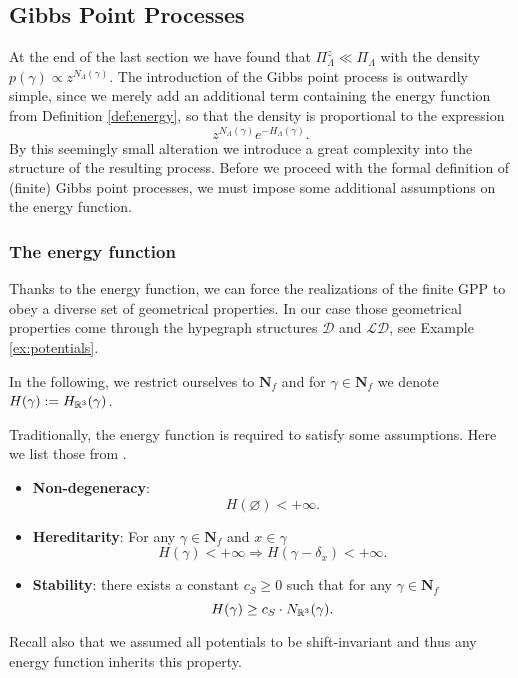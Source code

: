 \subsection{Gibbs Point Processes}\label{sec:GPP}
At the end of the last section we have found that $\Pi^z_\Lambda \ll \Pi_\Lambda$ with the density $p(\gamma) \propto z^{N_\Lambda(\gamma)}$. The introduction of the Gibbs point process is outwardly simple, since we merely add an additional term containing the energy function from Definition \ref{def:energy}, so that the density is proportional to the expression
\begin{equation}\label{eq:GPPdensity}z^{N_\Lambda(\gamma)} e^{-H_\Lambda (\gamma)}.\end{equation}
By this seemingly small alteration we introduce a great complexity into the structure of the resulting process. Before we proceed with the formal definition of (finite) Gibbs point processes, we must impose some additional assumptions on the energy function.


\subsubsection{The energy function}\label{sec:energyfunction}

Thanks to the energy function, we can force the realizations of the finite GPP to obey a diverse set of geometrical properties. In our case those geometrical properties come through the hypegraph structures $\mathcal D$ and $\mathcal {LD}$, see Example \ref{ex:potentials}. \newline

In the following, we restrict ourselves to $\mathbf N_f$ and for $\gamma \in \mathbf N_f$ we denote $H(\gamma):= H_{\mathbb R^3}(\gamma)$.\newline 

\noindent Traditionally, the energy function is required to satisfy some assumptions. Here we list those from \cite{Dereudre2017}. 
\begin{itemize}
	\item \textbf{Non-degeneracy}:
		$$H(\varnothing) < +\infty.$$
	\item \textbf{Hereditarity}: For any $\gamma \in \mathbf N_f$ and $x\in \gamma$
		$$H(\gamma)< + \infty \Rightarrow H(\gamma - \delta_x) < +\infty.$$
	\item \textbf{Stability}: there exists a constant $c_S\geq 0$ such that for any $\gamma \in \mathbf N_f$
		$$H(\gamma) \geq c_S\cdot N_{\mathbb R^3} (\gamma).$$
\end{itemize}
Recall also that we assumed all potentials to be shift-invariant and thus any energy function inherits this property.\newline

